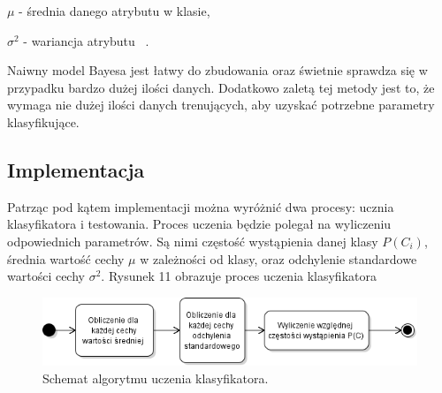 \documentclass[[10pt,a4paper]{article}
\begin{document}
$\mu$ - średnia danego atrybutu w klasie,

$\sigma^{2}$ - wariancja atrybutu ~\cite{aa}.	

\vspace{0.5cm}
Naiwny model Bayesa jest łatwy do zbudowania oraz świetnie sprawdza się w przypadku bardzo dużej ilości danych. Dodatkowo zaletą tej metody jest to, że wymaga nie dużej ilości danych trenujących, aby uzyskać potrzebne parametry klasyfikujące.
\subsection{Implementacja}
Patrząc pod kątem implementacji można wyróżnić dwa procesy: ucznia klasyfikatora i testowania. 
Proces uczenia będzie polegał na wyliczeniu odpowiednich parametrów. Są nimi częstość wystąpienia danej klasy $P(C_{i})$, średnia wartość cechy $\mu$ w zależności od klasy, oraz odchylenie standardowe wartości cechy $\sigma^{2}$. Rysunek 11 obrazuje proces uczenia klasyfikatora
\begin{figure}[h]
\centering
\includegraphics[scale = 0.5]{Obrazy/uczenie_schemat}
\caption{Schemat algorytmu uczenia klasyfikatora.}
\label{fig:obrazek k}
\end{figure}
\end{document}
